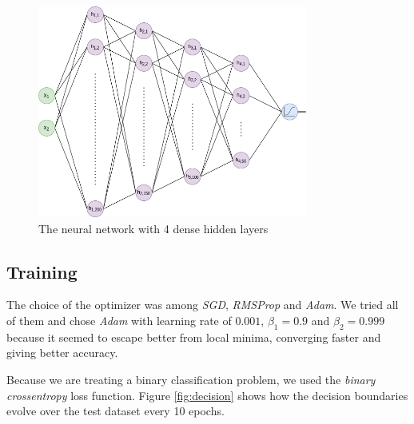 \documentclass[compsoc]{IEEEtran}
\begin{document}
\begin{figure}[ht!]
\centering                                                                        
\includegraphics[width=3.5in]{../images/nn-1.png}
\captionsetup{justification=centering}                                                                                                                                   
\caption{The neural network with 4 dense hidden layers}
\label{fig:nn}                                                                                                                                                           
\end{figure}

\subsection{Training}
The choice of the optimizer was among \emph{SGD}, \emph{RMSProp} and \emph{Adam}. We tried all of them and chose \emph{Adam} 
with learning rate of $0.001$, $\beta_{1}=0.9$ and $\beta_{2}=0.999$ because it seemed to escape better from local minima, converging faster and giving better accuracy. \par
Because we are treating a binary classification problem, we used the \emph{binary crossentropy} loss function.
Figure \ref{fig:decision} shows how the decision boundaries evolve over the test dataset every 10 epochs.
\end{document}
